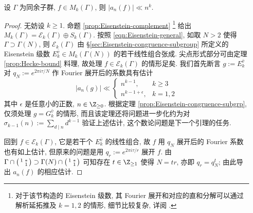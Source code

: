 \begin{theorem}\label{prop:Hecke-bound-cong}
	设 $\Gamma$ 为同余子群, $f \in M_k(\Gamma)$, 则 $|a_n(f)| \ll n^k$.
\end{theorem}
\begin{proof}
	无妨设 $k \geq 1$. 命题 \ref{prop:Eisenstein-complement} \footnote{对于该节构造的 Eisenstein 级数, 其 Fourier 展开和对应的直和分解可以通过解析延拓推及 $k = 1, 2$ 的情形, 细节比较复杂, 详阅 \cite[\S 7.2]{Mi89}.}
	给出 $M_k(\Gamma) = \mathcal{E}_k(\Gamma) \oplus S_k(\Gamma)$. 按照 \eqref{eqn:Eisenstein-general}, 如取 $N > 2$ 使得 $\Gamma \supset \Gamma(N)$, 则 $\mathcal{E}_k(\Gamma)$ 由 \S\ref{sec:Eisenstein-congruence-subgroup} 所定义的 Eisenstein 级数 $E_k^{\bar{v}} \in M_k(\Gamma(N))$ 的若干线性组合张成. 尖点形式部分可由定理 \ref{prop:Hecke-bound} 料理, 故处理 $f \in \mathcal{E}_k(\Gamma)$ 的情形足矣. 我们首先断言 $g := E_k^{\bar{v}}$ 对 $q_N := e^{2\pi i\tau/N}$ 作 Fourier 展开后的系数具有估计
	\[ |a_n(g)| \ll \begin{cases}
		n^{k-1}, & k \geq 3 \\
		n^{k-1+\epsilon}, & k =1,2
	\end{cases} \]
	其中 $\epsilon$ 是任意小的正数, $n \in \Z_{\geq 0}$. 根据定理 \ref{prop:Eisenstein-congruence-subgrp}, 仅须处理 $g = G_k^{\bar{v}}$ 的情形, 而且该定理还将问题进一步化约为对 $\sigma_{k-1}(n) := \sum_{d \mid n} d^{k-1}$ 验证上述估计, 这个数论问题是下一个引理的任务.
	
	回到 $f \in \mathcal{E}_k(\Gamma)$, 它是若干个 $E_k^{\bar{v}}$ 的线性组合, 故 $f$ 用 $q_N$ 展开后的 Fourier 系数也有如上估计, 但原来的问题是用 $q_r := e^{2\pi i\tau/r}$ 展开 $f$. 由 $\Gamma \cap \bigl(\begin{smallmatrix} 1 & * \\  & 1 \end{smallmatrix}\bigr) \supset \Gamma(N) \cap \bigl(\begin{smallmatrix} 1 & * \\  & 1 \end{smallmatrix}\bigr)$ 可知存在 $t \in \Z_{\geq 1}$ 使得 $N = tr$, 亦即 $q_r = q_N^t$; 由此导出 $a_n(f)$ 的相应估计.
\end{proof}

